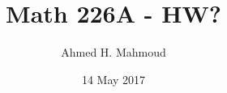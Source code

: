 \documentclass[12pt]{article}
\begin{document}
\title{Math 226A - HW?}
\author{Ahmed H. Mahmoud}
\date{14 May 2017} 

\maketitle

\newcommand{\cn}{Crank-Nicolson}




\newpage

%




\end{document}
